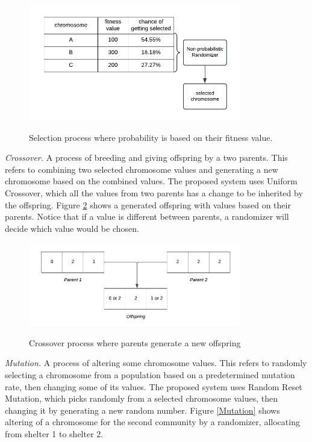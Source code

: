 	\begin{figure}[h!]
		\caption{Selection process where probability is based on their fitness value.}
		\centering
		\includegraphics[width=350px]{Selection}
		\label{Selection}
	\end{figure}
	
	\textit{Crossover.} A process of breeding and giving offspring by a two parents. This refers to combining two selected chromosome values and generating a new chromosome based on the combined values. The proposed system uses Uniform Crossover, which all the values from two parents has a change to be inherited by the offspring. Figure \ref{Crossover} shows a generated offspring with values based on their parents. Notice that if a value is different between parents, a randomizer will decide which value would be chosen.
	
	\begin{figure}[h!]
		\caption{Crossover process where parents generate a new offspring}
		\centering
		\includegraphics[width=350px]{Crossover}
		\label{Crossover}
	\end{figure}
	
	\textit{Mutation.} A process of altering some chromosome values. This refers to randomly selecting a chromosome from a population based on a predetermined mutation rate, then changing some of its values. The proposed system uses Random Reset Mutation, which picks randomly from a selected chromosome values, then changing it by generating a new random number. Figure \ref{Mutation} shows altering of a chromosome for the second community by a randomizer, allocating from shelter 1 to shelter 2.
	
